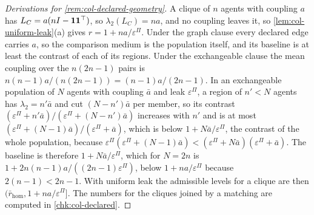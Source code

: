 \begin{proof}[Derivations for \cref{rem:col-declared-geometry}]
A clique of $n$ agents with coupling $a$ has $L_C=a(nI-\mathbf{1}\mathbf{1}^\top)$, so $\lambda_2(L_C)=na$, and no coupling leaves it, so \cref{lem:col-uniform-leak}(a) gives $r=1+na/\varepsilon^\Pi$. Under the graph clause every declared edge carries $a$, so the comparison medium is the population itself, and its baseline is at least the contrast of each of its regions. Under the exchangeable clause the mean coupling over the $n(2n-1)$ pairs is $n(n-1)a/(n(2n-1))=(n-1)a/(2n-1)$. In an exchangeable population of $N$ agents with coupling $\bar a$ and leak $\varepsilon^\Pi$, a region of $n'<N$ agents has $\lambda_2=n'\bar a$ and cut $(N-n')\bar a$ per member, so its contrast $(\varepsilon^\Pi+n'\bar a)/(\varepsilon^\Pi+(N-n')\bar a)$ increases with $n'$ and is at most $(\varepsilon^\Pi+(N-1)\bar a)/(\varepsilon^\Pi+\bar a)$, which is below $1+N\bar a/\varepsilon^\Pi$, the contrast of the whole population, because $\varepsilon^\Pi(\varepsilon^\Pi+(N-1)\bar a)<(\varepsilon^\Pi+N\bar a)(\varepsilon^\Pi+\bar a)$. The baseline is therefore $1+N\bar a/\varepsilon^\Pi$, which for $N=2n$ is $1+2n(n-1)a/((2n-1)\varepsilon^\Pi)$, below $1+na/\varepsilon^\Pi$ because $2(n-1)<2n-1$. With uniform leak the admissible levels for a clique are then $(\bar r_{\mathrm{hom}},1+na/\varepsilon^\Pi]$. The numbers for the cliques joined by a matching are computed in \cref{chk:col-declared}.
\end{proof}

